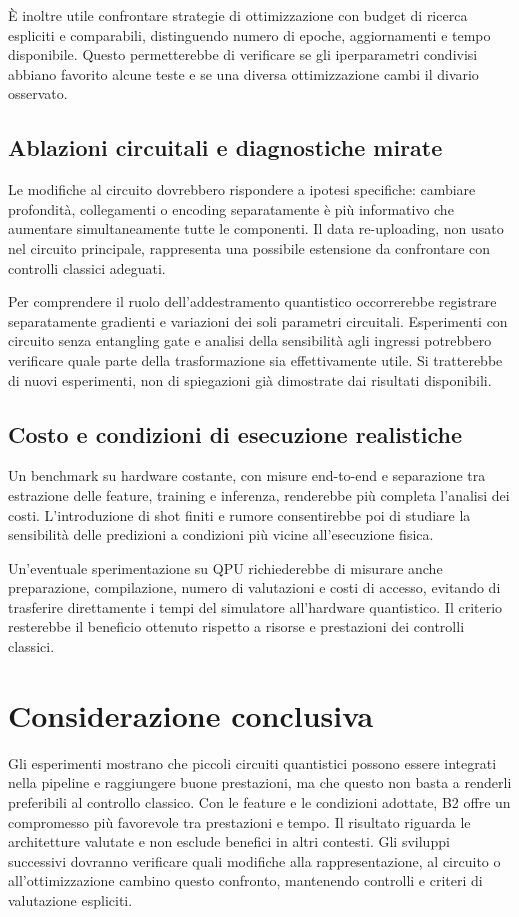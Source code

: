 È inoltre utile confrontare strategie di ottimizzazione con
budget di ricerca espliciti e comparabili, distinguendo
numero di epoche, aggiornamenti e tempo disponibile. Questo
permetterebbe di verificare se gli iperparametri condivisi
abbiano favorito alcune teste e se una diversa ottimizzazione
cambi il divario osservato.

\subsection{Ablazioni circuitali e diagnostiche mirate}

Le modifiche al circuito dovrebbero rispondere a ipotesi
specifiche: cambiare profondità, collegamenti o encoding
separatamente è più informativo che aumentare simultaneamente
tutte le componenti. Il data re-uploading, non usato nel
circuito principale, rappresenta una possibile estensione
da confrontare con controlli classici adeguati.

Per comprendere il ruolo dell'addestramento quantistico
occorrerebbe registrare separatamente gradienti e variazioni
dei soli parametri circuitali. Esperimenti con circuito
senza entangling gate e analisi della sensibilità agli
ingressi potrebbero verificare quale parte della trasformazione
sia effettivamente utile. Si tratterebbe di nuovi esperimenti,
non di spiegazioni già dimostrate dai risultati disponibili.

\subsection{Costo e condizioni di esecuzione realistiche}

Un benchmark su hardware costante, con misure end-to-end
e separazione tra estrazione delle feature, training e
inferenza, renderebbe più completa l'analisi dei costi.
L'introduzione di shot finiti e rumore consentirebbe poi
di studiare la sensibilità delle predizioni a condizioni
più vicine all'esecuzione fisica.

Un'eventuale sperimentazione su QPU richiederebbe di misurare
anche preparazione, compilazione, numero di valutazioni e
costi di accesso, evitando di trasferire direttamente i
tempi del simulatore all'hardware quantistico. Il criterio
resterebbe il beneficio ottenuto rispetto a risorse e
prestazioni dei controlli classici.

\section{Considerazione conclusiva}

Gli esperimenti mostrano che piccoli circuiti quantistici possono
essere integrati nella pipeline e raggiungere buone prestazioni,
ma che questo non basta a renderli preferibili al controllo classico.
Con le feature e le condizioni adottate, B2 offre un compromesso
più favorevole tra prestazioni e tempo. Il risultato riguarda le
architetture valutate e non esclude benefici in altri contesti.
Gli sviluppi successivi dovranno verificare quali modifiche alla
rappresentazione, al circuito o all'ottimizzazione cambino questo
confronto, mantenendo controlli e criteri di valutazione espliciti.
